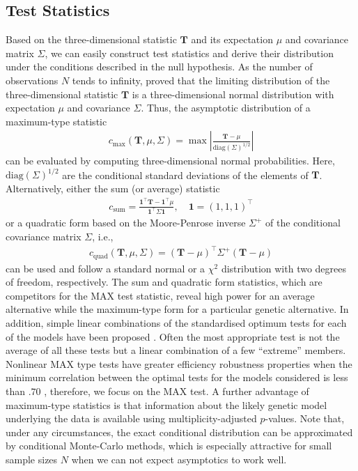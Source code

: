 \documentclass[bimj,fleqn]{w-art}
\newcommand{\T}{\mathbf{T}}
\begin{document}
\subsection{Test Statistics}

Based on the three-dimensional statistic $\T$ and its expectation 
$\mu$ and covariance matrix $\Sigma$, we can easily construct test 
statistics and derive their distribution under the conditions
described in the null hypothesis. As the number of observations 
$N$ tends to infinity, \citet{StrasserWeber1999}
proved that the limiting distribution of the three-dimensional 
statistic $\T$ is a three-dimensional normal distribution with 
expectation $\mu$ and covariance $\Sigma$. Thus, the asymptotic distribution
of a maximum-type statistic
\begin{eqnarray*}
c_\text{max}(\T, \mu, \Sigma)  = \max \left| \frac{\T - \mu}{\text{diag}(\Sigma)^{1/2}} \right|
\end{eqnarray*}
can be evaluated by computing three-dimensional normal probabilities. Here,
$\text{diag}(\Sigma)^{1/2}$ are the conditional standard deviations of
the elements of $\T$. Alternatively, either the sum (or average) statistic
\begin{eqnarray*}
c_\text{sum} = \frac{\mathbf{1}^\top \T - \mathbf{1}^\top\mu}{\mathbf{1}^\top \Sigma \mathbf{1}}, \quad \mathbf{1} = (1, 1, 1)^\top
\end{eqnarray*}
or a quadratic form 
based on the Moore-Penrose inverse $\Sigma^+$ of the conditional covariance
matrix $\Sigma$, i.e.,
\begin{eqnarray*}
c_\text{quad}(\T, \mu, \Sigma)  = (\T - \mu)^\top \Sigma^+ (\T - \mu)
\end{eqnarray*}
can be used and 
follow a standard normal or a $\chi^2$ distribution with two degrees of freedom, respectively. 
The sum and quadratic form statistics, which are competitors for the MAX 
test statistic, reveal high power for an average alternative while the maximum-type 
form for a particular genetic alternative.
In addition, simple linear combinations of the standardised optimum tests for each of
the models have been proposed \citep{Gastwirth:1985}. Often the most appropriate test is not the
average of all these tests but a linear combination of a few ``extreme'' members. Nonlinear
MAX type tests have greater efficiency robustness properties when the minimum
correlation between the optimal tests for the models considered is less than $.70$ 
\citep{Freidlin+Podgor+Gastwirth:1999}, therefore, we focus on the MAX test. A further advantage of 
maximum-type statistics is that information about the likely genetic model underlying the data 
is available using multiplicity-adjusted $p$-values.
Note that, under any circumstances, the exact conditional distribution 
can be approximated by conditional Monte-Carlo methods, which is especially 
attractive for small sample sizes $N$ when we can not expect asymptotics 
to work well.
\end{document}
